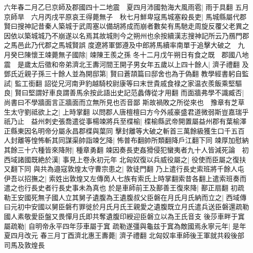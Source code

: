 六年春二月乙巳京師及郡國四十二地震　夏四月沛國勃海大風雨雹|{
	雨于具翻}
五月京師旱　六月丙戌平原哀王得薨無子　秋七月鮮卑寇馬城塞殺長吏|{
	馬城縣屬代郡賢曰搜神記昔秦人築城于武周塞以備胡將成而崩者數矣有馬馳走周旋反覆父老異之因依以築城城乃不崩遂以名焉其故城則今之朔州也余按續漢志搜神記所云乃鴈門郡之馬邑此乃代郡之馬城賢誤}
度遼將軍鄧遵及中郎將馬續率南單于追擊大破之　九月癸巳陳懷王竦薨無子國除|{
	竦陳王羨之孫}
冬十二月戊午朔日有食之既　郡國八地震　是歲太后徵和帝弟濟北王夀河間王開子男女年五歲以上四十餘人|{
	濟子禮翻}
及鄧氏近親子孫三十餘人並為開邸第|{
	賢曰蒼頡篇曰邸舍也為于偽翻}
教學經書躬自監試|{
	監工銜翻}
詔從兄河南尹豹越騎校尉康等曰末世貴戚食禄之家温衣羨飯乘堅驅良|{
	賢曰堅謂好車良謂善馬余按此語出史記范蠡傳從才用翻}
而面牆弗學不識臧否|{
	尚書曰不學牆面言正牆面而立無所見也否音鄙}
斯故禍敗之所從來也　豫章有芝草生太守劉祗欲上之|{
	上時掌翻}
以問郡人唐檀檀曰方今外戚豪盛君道微弱斯豈嘉瑞乎祇乃止　益州刺史張喬遣從事楊竦將兵至楪榆|{
	楪榆縣武帝開置屬益州郡有葉榆澤正縣東因名明帝分屬永昌郡楪與葉同}
擊封離等大破之斬首三萬餘級獲生口千五百人封離等惶怖斬其同謀渠帥詣竦乞降|{
	怖普布翻帥所類翻降戶江翻下同}
竦厚加慰納其餘三十六種皆來降附|{
	種章勇翻}
竦因奏長吏姦猾侵犯蠻夷者九十人皆減死論　初西域諸國既絶於漢|{
	事見上卷永初元年}
北匈奴復以兵威役屬之|{
	役使而臣屬之復扶又翻下同}
與共為邉寇敦煌太守曹宗患之|{
	敦徒門翻}
乃上遣行長史索班將千餘人屯伊吾以招撫之|{
	索姓出敦煌又左傳啇人七族有索氏上時掌翻索昔各翻上遣索班奏而遣之也行長史者行長史事未為真也}
於是車師前王及鄯善王復來降|{
	鄯正扇翻}
初疏勒王安國死無子國人立其舅子遺腹為王遺腹叔父臣磐在月氏月氏納而立之|{
	西域傳曰元初中安國以舅臣磐冇罪徙於月氏月氏王親愛之遺腹既立月氏遣兵送臣磐還疏勒國人素敬愛臣盤又畏憚月氏即共奪遺腹印綬迎臣磐立以為王氏音支}
後莎車畔于窴屬疏勒|{
	自明帝永平四年莎車屬于窴}
疏勒遂彊與龜兹于窴為敵國焉永寧元年|{
	是年夏四月改元}
春三月丁酉濟北惠王夀薨|{
	濟子禮翻}
北匈奴率車師後王軍就共殺後部司馬及敦煌長

